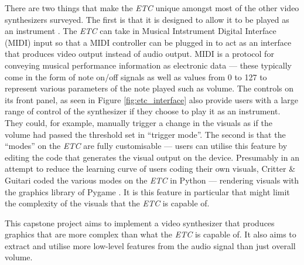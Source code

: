 \documentclass[../../main_report2.tex]{subfiles}
\begin{document}
There are two things that make the \textit{ETC} unique amongst most of the other video synthesizers surveyed. The first is that it is designed to allow it to be played as an instrument \cite{ETCmanual}. The \textit{ETC} can take in Musical Intstrument Digital Interface (MIDI) input so that a MIDI controller can be plugged in to act as an interface that produces video output instead of audio output. MIDI is a protocol for conveying musical performance information as electronic data \cite{midispecs} --- these typically come in the form of note on/off signals as well as values from 0 to 127 to represent various parameters of the note played such as volume. The controls on its front panel, as seen in Figure \ref{fig:etc_interface} also provide users with a large range of control of the synthesizer if they choose to play it as an instrument. They could, for example, manually trigger a change in the visuals as if the volume had passed the threshold set in ``trigger mode''. The second is that the ``modes'' on the \textit{ETC} are fully customisable --- users can utilise this feature by editing the code that generates the visual output on the device. Presumably in an attempt to reduce the learning curve of users coding their own visuals, Critter \& Guitari coded the various modes on the \textit{ETC} in Python --- rendering visuals with the graphics library of Pygame \cite{ETCmanual}. It is this feature in particular that might limit the complexity of the visuals that the \textit{ETC} is capable of. \par

This capstone project aims to implement a video synthesizer that produces graphics that are more complex than what the \textit{ETC} is capable of. It also aims to extract and utilise more low-level features from the audio signal than just overall volume.
\end{document}
